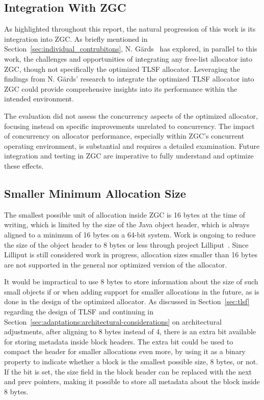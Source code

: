 
\subsection{Integration With ZGC}
\label{sec:future-work:integration}

As highlighted throughout this report, the natural progression of this work is its integration into ZGC. As briefly mentioned in Section~\ref{sec:individual_contrubitons}, N. Gärds~\cite{niclas_report} has explored, in parallel to this work, the challenges and opportunities of integrating any free-list allocator into ZGC, though not specifically the optimized TLSF allocator. Leveraging the findings from N. Gärds’ research to integrate the optimized TLSF allocator into ZGC could provide comprehensive insights into its performance within the intended environment.

The evaluation did not assess the concurrency aspects of the optimized allocator, focusing instead on specific improvements unrelated to concurrency. The impact of concurrency on allocator performance, especially within ZGC's concurrent operating environment, is substantial and requires a detailed examination. Future integration and testing in ZGC are imperative to fully understand and optimize these effects.

\subsection{Smaller Minimum Allocation Size}
\label{sec:future-work:lilliput}

The smallest possible unit of allocation inside ZGC is 16 bytes at the time of writing, which is limited by the size of the Java object header, which is always aligned to a minimum of 16 bytes on a 64-bit system. Work is ongoing to reduce the size of the object header to 8 bytes or less through project Lilliput~\cite{lilliput}. Since Lilliput is still considered work in progress, allocation sizes smaller than 16 bytes are not supported in the general nor optimized version of the allocator.

It would be impractical to use 8 bytes to store information about the size of such small objects if or when adding support for smaller allocations in the future, as is done in the design of the optimized allocator. As discussed in Section~\ref{sec:tlsf} regarding the design of TLSF and continuing in Section~\ref{sec:adaptations:architectural-considerations} on architectural adjustments, after aligning to 8 bytes instead of 4, there is an extra bit available for storing metadata inside block headers. The extra bit could be used to compact the header for smaller allocations even more, by using it as a binary property to indicate whether a block is the smallest possible size, 8 bytes, or not. If the bit is set, the size field in the block header can be replaced with the next and prev pointers, making it possible to store all metadata about the block inside 8 bytes.

